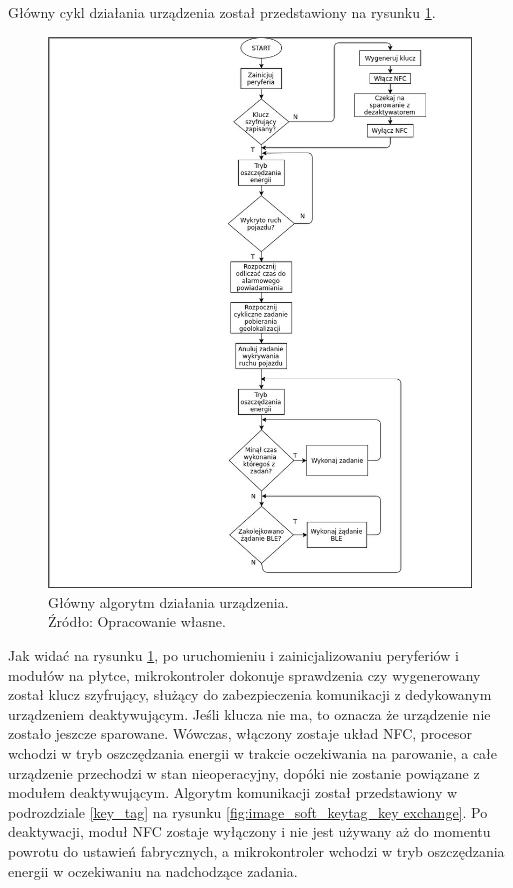 Główny cykl działania urządzenia został przedstawiony na rysunku \ref{fig:image_soft_mainboard_main_alghoritm}.

\begin{figure}[H]
	\centering
	\includegraphics[width=16cm]{img/software/mainboard/Tracking_alghoritm.jpg}
	\caption{Główny algorytm działania urządzenia. 
	\\Źródło: Opracowanie własne.}
	\label{fig:image_soft_mainboard_main_alghoritm}
\end{figure}

Jak widać na rysunku \ref{fig:image_soft_mainboard_main_alghoritm}, po uruchomieniu i zainicjalizowaniu peryferiów i modułów na płytce, mikrokontroler dokonuje sprawdzenia czy wygenerowany został klucz szyfrujący, służący do zabezpieczenia komunikacji z dedykowanym urządzeniem deaktywującym. Jeśli klucza nie ma, to oznacza że urządzenie nie zostało jeszcze sparowane. Wówczas, włączony zostaje układ NFC, procesor wchodzi w tryb oszczędzania energii w trakcie oczekiwania na parowanie, a całe urządzenie przechodzi w stan nieoperacyjny, dopóki nie zostanie powiązane z modułem deaktywującym. Algorytm komunikacji został przedstawiony w podrozdziale \ref{key_tag} na rysunku \ref{fig:image_soft_keytag_key exchange}. Po deaktywacji, moduł NFC zostaje wyłączony i nie jest używany aż do momentu powrotu do ustawień fabrycznych, a mikrokontroler wchodzi w tryb oszczędzania energii w oczekiwaniu na nadchodzące zadania.

